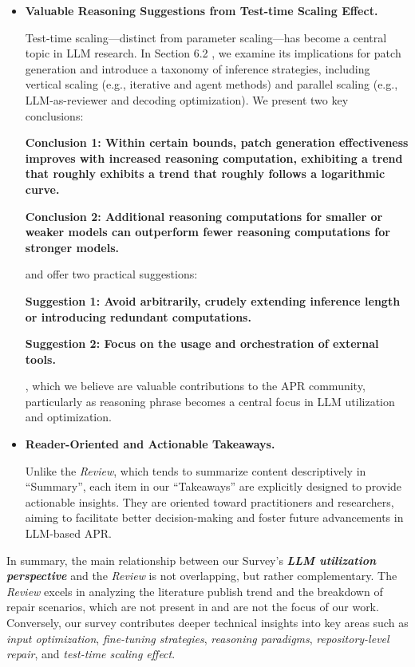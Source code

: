 \documentclass[acmsmall]{acmart}
\begin{document}
\begin{itemize}
		\item \textbf{Valuable Reasoning Suggestions from Test-time Scaling Effect.}

			Test-time scaling---distinct from parameter scaling---has become a central topic in LLM research.
			In
			\color{red}
			Section 6.2
			\color{black}
			, we examine its implications for patch generation and introduce a taxonomy of inference
			strategies, including vertical scaling (e.g., iterative and agent methods) and parallel scaling
			(e.g., LLM-as-reviewer and decoding optimization). We present two key conclusions:

			\color{blue}
			\textbf{Conclusion 1: Within certain bounds, patch generation effectiveness improves
			with increased reasoning computation, exhibiting a trend that roughly exhibits a trend that
			roughly follows a logarithmic curve.}

			\textbf{Conclusion 2: Additional reasoning computations for smaller or weaker models can
			outperform fewer reasoning computations for stronger models. }
			\newline
			\color{black}

			and offer two practical suggestions:

			\color{blue}
			\textbf{Suggestion 1: Avoid arbitrarily, crudely extending inference length or
			introducing redundant computations.}

			\textbf{Suggestion 2: Focus on the usage and orchestration of external tools.}
			\color{black}
			\bigskip

			, which we believe are valuable contributions to the APR community, particularly as reasoning
			phrase becomes a central focus in LLM utilization and optimization.
			\newline

		\item \textbf{Reader-Oriented and Actionable Takeaways.}

			Unlike the \textit{Review}, which tends to summarize content descriptively in “Summary”,
			each item in our “Takeaways” are explicitly designed to provide actionable insights. They
			are oriented toward practitioners and researchers, aiming to facilitate better decision-making
			and foster future advancements in LLM-based APR.
	\end{itemize}

	In summary, the main relationship between our Survey's \textbf{\textit{LLM utilization
	perspective}} and the \textit{Review} is not overlapping, but rather complementary. The \textit{Review}
	excels in analyzing the literature publish trend and the breakdown of repair scenarios, which
	are not present in and are not the focus of our work. Conversely, our survey contributes deeper
	technical insights into key areas such as \textit{input optimization}, \textit{fine-tuning
	strategies}, \textit{reasoning paradigms}, \textit{repository-level repair}, and \textit{test-time
	scaling effect}.
\end{document}
